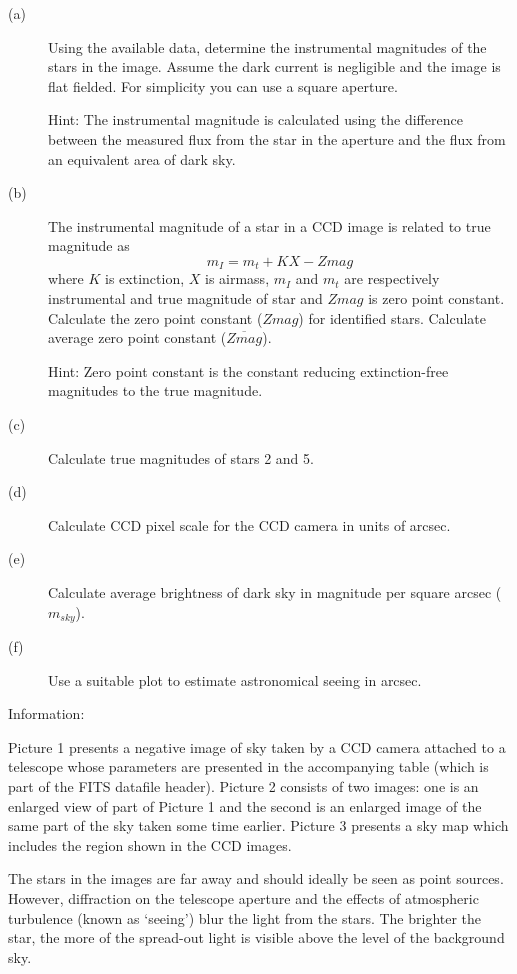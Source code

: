 \begin{description}
\item[(a)] Using the available data, determine the instrumental magnitudes
  of the stars in the image. Assume the dark current is negligible and the
  image is flat fielded. For simplicity you can use a square aperture.

  Hint: The instrumental magnitude is calculated using the difference
  between the measured flux from the star in the aperture and the flux from
  an equivalent area of dark sky.
\item[(b)] The instrumental magnitude of a star in a CCD image is related to
  true magnitude as
  \[ m_I = m_t + KX - Zmag \]
  where $K$ is extinction, $X$ is airmass, $m_I$ and $m_t$ are respectively
  instrumental and true magnitude of star and $Zmag$ is zero point constant.
  Calculate the zero point constant ($Zmag$) for identified stars. Calculate
  average zero point constant ($\overline{Zmag}$).

  Hint: Zero point constant is the constant reducing extinction-free
  magnitudes to the true magnitude.
\item[(c)] Calculate true magnitudes of stars 2 and 5.
\item[(d)] Calculate CCD pixel scale for the CCD camera in units of arcsec.
\item[(e)] Calculate average brightness of dark sky in magnitude per square
  arcsec ($m_{sky}$).
\item[(f)] Use a suitable plot to estimate astronomical seeing in arcsec.
\end{description}

Information:

Picture 1 presents a negative image of sky taken by a CCD camera attached to
a telescope whose parameters are presented in the accompanying table (which
is part of the FITS datafile header). Picture 2 consists of two images: one
is an enlarged view of part of Picture 1 and the second is an enlarged image
of the same part of the sky taken some time earlier. Picture 3 presents a
sky map which includes the region shown in the CCD images.

The stars in the images are far away and should ideally be seen as point
sources. However, diffraction on the telescope aperture and the effects of
atmospheric turbulence (known as `seeing') blur the light from the stars.
The brighter the star, the more of the spread-out light is visible above the
level of the background sky.

